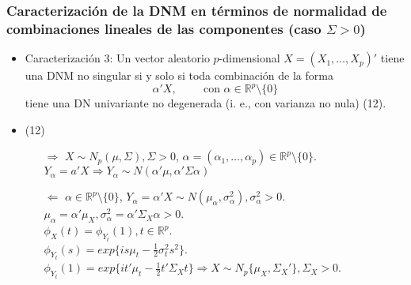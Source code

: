 \documentclass[11pt,a4paper]{article}
\begin{document}
\subsubsection{Caracterización de la DNM en términos de normalidad de combinaciones lineales de las componentes (caso \texorpdfstring{$\Sigma > 0$}))}
\begin{itemize}
\item Caracterización 3: Un vector aleatorio $p$-dimensional $X = (X_{1}, \dots, X_{p})'$ tiene una DNM no singular si y solo si toda combinación de la forma
$$\alpha'X, \hspace{1cm} \text{con } \alpha \in \mathbb{R}^{p} \setminus \{0\}$$
tiene una DN univariante no degenerada (i. e., con varianza no nula) \hspace{1cm} (12).

\item (12)
\begin{itemize}
\item[$\Rightarrow$] $X \sim N_{p}(\mu, \Sigma), \Sigma > 0$, $\alpha = (\alpha_{1}, \dots, \alpha_{p}) \in \mathbb{R}^{p} \setminus \{0\}$. \\
$Y_{\alpha} = a'X \Rightarrow Y_{\alpha} \sim N(\alpha'\mu, \alpha'\Sigma\alpha)$
\item[$\Leftarrow$] $\alpha \in \mathbb{R}^{p} \setminus \{0\}$, $Y_{\alpha} = \alpha'X \sim N(\mu_{\alpha}, \sigma_{\alpha}^{2}), \sigma_{\alpha}^{2} > 0$. \\
$\mu_{\alpha} = \alpha'\mu_{X}, \sigma_{\alpha}^{2} = \alpha'\Sigma_{X}\alpha > 0$. \\
$\phi_{X}(t) = \phi_{Y_{t}}(1), t \in \mathbb{R}^{p}$. \\
$\phi_{Y_{t}}(s) = exp\{is\mu_{t} - \frac{1}{2}\sigma_{t}^{2}s^{2}\}$. \\
$\phi_{Y_{t}}(1) = exp\{it'\mu_{t} - \frac{1}{2}t'\Sigma_{X}t\} \Rightarrow X \sim N_{p}\{\mu_{X}, \Sigma_{X}'\}, \Sigma_{X} > 0$.
\end{itemize}
\end{itemize}
\end{document}

